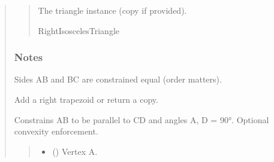 \documentclass[letterpaper,10pt,english]{sphinxmanual}
\begin{document}
\begin{quote}
\begin{fulllineitems}
\begin{fulllineitems}
\begin{quote}
\begin{description}
\begin{itemize}
\end{itemize}

\sphinxAtStartPar
The triangle instance (copy if provided).

\sphinxAtStartPar
RightIsoscelesTriangle

\end{description}\end{quote}
\subsubsection*{Notes}

\sphinxAtStartPar
Sides AB and BC are constrained equal (order matters).

\end{fulllineitems}


\begin{fulllineitems}
\label{\detokenize{pygeox:pygeox.add_objects.AddNamespace.right_trapezoid}}
\pysigstartsignatures
\pysiglinewithargsret
{}
{\sphinxparamcomma {}\sphinxparamcomma {}\sphinxparamcomma {}\sphinxparamcomma {}\sphinxparamcomma {}\sphinxparamcomma {}}
{}
\pysigstopsignatures
\sphinxAtStartPar
Add a right trapezoid or return a copy.

\sphinxAtStartPar
Constrains AB to be parallel to CD and angles A, D = 90°. Optional convexity enforcement.
\begin{quote}\begin{description}
\begin{itemize}
\item {} 
\sphinxAtStartPar
{} (\sphinxstyleliteralemphasis{\sphinxupquote{ | }}) \textendash{} Vertex A.


\end{itemize}
\end{description}
\end{quote}
\end{fulllineitems}
\end{fulllineitems}
\end{quote}
\end{document}
